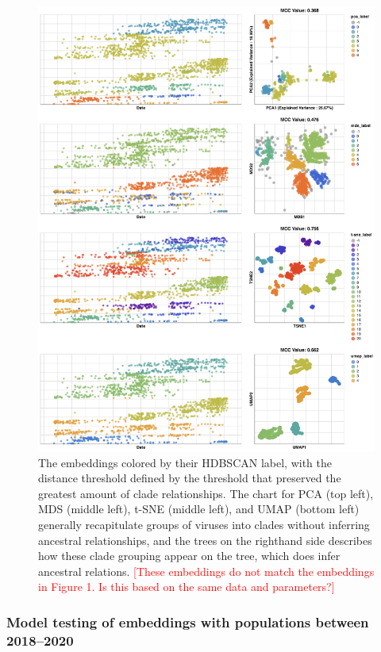 \documentclass[9pt,lineno]{elife}
\def\jhc#1{\textcolor{red}{[#1]}}
\begin{document}
\begin{figure}[htb]
  \begin{center}
  \includegraphics[width=\columnwidth]{fullHDBSCANChartFlu.png}
  \caption{
    The embeddings colored by their HDBSCAN label, with the distance threshold defined by the threshold that preserved the greatest amount of clade relationships.
    The chart for PCA (top left), MDS (middle left), t-SNE (middle left), and UMAP (bottom left) generally recapitulate groups of viruses into clades without inferring ancestral relationships, and the trees on the righthand side describes how these clade grouping appear on the tree, which does infer ancestral relations.
    \jhc{These embeddings do not match the embeddings in Figure 1. Is this based on the same data and parameters?}
  }
  \label{fig:seasonal-influenza-h3n2-ha-clusters}
  \end{center}
\end{figure}

\subsubsection*{Model testing of embeddings with populations between 2018--2020}
\end{document}
